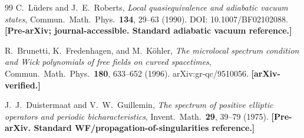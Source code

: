 \documentclass[12pt,letterpaper]{article}
\begin{document}
\begin{thebibliography}{99}
  C.~L\"{u}ders and J.~E.~Roberts,
  \textit{Local quasiequivalence and adiabatic vacuum states},
  Commun.~Math.~Phys.\ \textbf{134}, 29--63 (1990).
  DOI: 10.1007/BF02102088.
  \textbf{[Pre-arXiv; journal-accessible. Standard adiabatic vacuum reference.]}

  R.~Brunetti, K.~Fredenhagen, and M.~K\"{o}hler,
  \textit{The microlocal spectrum condition and Wick polynomials
  of free fields on curved spacetimes},
  Commun.~Math.~Phys.\ \textbf{180}, 633--652 (1996).
  arXiv:gr-qc/9510056.
  \textbf{[arXiv-verified.]}

  J.~J.~Duistermaat and V.~W.~Guillemin,
  \textit{The spectrum of positive elliptic operators and periodic bicharacteristics},
  Invent.~Math.\ \textbf{29}, 39--79 (1975).
  \textbf{[Pre-arXiv. Standard WF/propagation-of-singularities reference.]}

\end{thebibliography}
\end{document}
